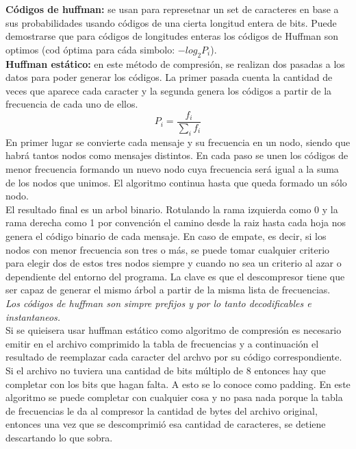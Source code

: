 \documentclass[titlepage,a4paper]{article}
\begin{document}
\textbf{Códigos de huffman:} se usan para represetnar un set de caracteres en base a sus probabilidades usando códigos de una cierta longitud entera de bits. Puede demostrarse que para códigos de longitudes enteras los códigos de Huffman son optimos (cod óptima para cáda simbolo: $-log_2P_i$).\\

\textbf{Huffman estático: } en este método de compresión, se realizan dos pasadas a los datos para poder generar los códigos. La primer pasada cuenta la cantidad de veces que aparece cada caracter y la segunda genera los códigos a partir de la frecuencia de cada uno de ellos.  $$P_i = \frac{f_i}{\sum_i f_i}$$
 En primer lugar se convierte cada mensaje y su frecuencia en un nodo, siendo que habrá tantos nodos como mensajes distintos. En cada paso se unen los códigos de menor frecuencia formando un nuevo nodo cuya frecuencia será igual a la suma de los nodos que unimos. El algoritmo continua hasta que queda formado un sólo nodo. \\

El resultado final es un arbol binario. Rotulando  la rama izquierda como 0 y la rama derecha como 1 por convención el camino desde la raiz hasta cada hoja nos genera el código binario de cada mensaje.  En caso de empate, es decir, si los nodos con menor frecuencia son tres o más, se puede tomar cualquier criterio para elegir dos de estos tres nodos siempre y cuando no sea un criterio al azar o dependiente del entorno del programa. La clave es que el descompresor tiene que ser capaz de generar el mismo árbol a partir de la misma lista de frecuencias. \\

\textit{Los códigos de huffman son simpre prefijos y por lo tanto decodificables e instantaneos. }\\

Si se quieisera usar huffman estático como algoritmo de compresión es necesario emitir en el archivo comprimido la tabla de frecuencias y a continuación el resultado de reemplazar cada caracter del archvo por su código correspondiente. \\

Si el archivo no tuviera una cantidad de bits múltiplo de 8 entonces hay que completar con los bits que hagan falta. A esto se lo conoce como padding. En este algoritmo se puede completar con cualquier cosa y no pasa nada porque la tabla de frecuencias le da al compresor la cantidad de bytes del archivo original, entonces una vez que se descomprimió esa cantidad de caracteres, se detiene descartando lo que sobra. \\
\end{document}
